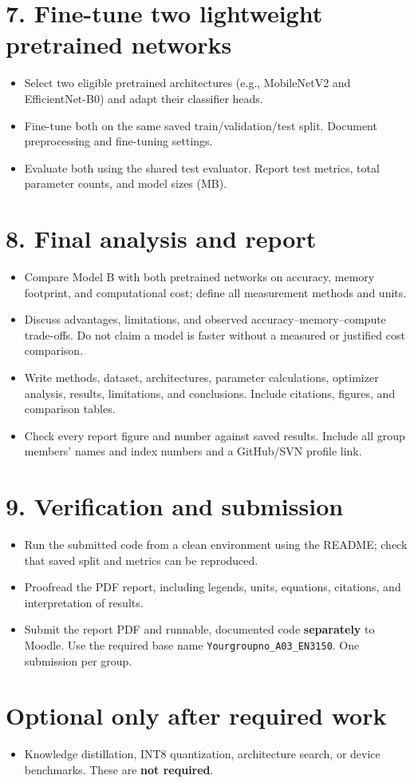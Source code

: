 \documentclass[11pt,a4paper]{article}
\newcommand{\task}[1]{\item[$\square$] #1}
\newcommand{\phase}[1]{\Needspace{8\baselineskip}\section*{\color{accent}#1}}
\begin{document}
\phase{7. Fine-tune two lightweight pretrained networks}
\begin{itemize}
\task{Select two eligible pretrained architectures (e.g., MobileNetV2 and EfficientNet-B0) and adapt their classifier heads.}
\task{Fine-tune both on the same saved train/validation/test split. Document preprocessing and fine-tuning settings.}
\task{Evaluate both using the shared test evaluator. Report test metrics, total parameter counts, and model sizes (MB).}
\end{itemize}

\phase{8. Final analysis and report}
\begin{itemize}
\task{Compare Model B with both pretrained networks on accuracy, memory footprint, and computational cost; define all measurement methods and units.}
\task{Discuss advantages, limitations, and observed accuracy--memory--compute trade-offs. Do not claim a model is faster without a measured or justified cost comparison.}
\task{Write methods, dataset, architectures, parameter calculations, optimizer analysis, results, limitations, and conclusions. Include citations, figures, and comparison tables.}
\task{Check every report figure and number against saved results. Include all group members' names and index numbers and a GitHub/SVN profile link.}
\end{itemize}

\phase{9. Verification and submission}
\begin{itemize}
\task{Run the submitted code from a clean environment using the README; check that saved split and metrics can be reproduced.}
\task{Proofread the PDF report, including legends, units, equations, citations, and interpretation of results.}
\task{Submit the report PDF and runnable, documented code \textbf{separately} to Moodle. Use the required base name \texttt{Yourgroupno\_A03\_EN3150}. One submission per group.}
\end{itemize}

\phase{Optional only after required work}
\begin{itemize}
\task{Knowledge distillation, INT8 quantization, architecture search, or device benchmarks. These are \textbf{not required}.}
\end{itemize}
\end{document}
